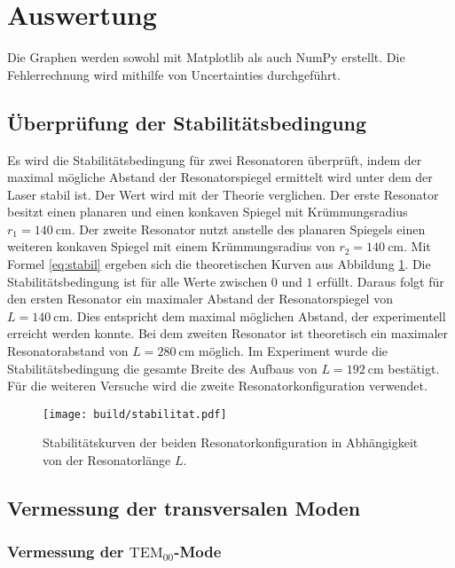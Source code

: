\section{Auswertung}
\label{sec:Auswertung}

Die Graphen werden sowohl mit Matplotlib \cite{matplotlib} als auch NumPy \cite{numpy} erstellt. Die Fehlerrechnung wird mithilfe von Uncertainties \cite{uncertainties} durchgeführt.

\subsection{Überprüfung der Stabilitätsbedingung}

Es wird die Stabilitätsbedingung für zwei Resonatoren überprüft, indem der maximal mögliche Abstand der Resonatorspiegel ermittelt wird unter dem der Laser stabil ist. Der Wert wird mit der Theorie verglichen. Der erste Resonator besitzt einen planaren und einen konkaven Spiegel mit Krümmungsradius $r_1=\SI{140}{\centi\metre}$.    
Der zweite Resonator nutzt anstelle des planaren Spiegels einen weiteren konkaven Spiegel mit einem Krümmungsradius von $r_2=\SI{140}{\centi\metre}$. 
Mit Formel \eqref{eq:stabil} ergeben sich die theoretischen Kurven aus Abbildung \ref{fig:stabilität}. 
Die Stabilitätsbedingung ist für alle Werte zwischen $0$ und $1$ erfüllt. Daraus folgt für den ersten Resonator ein maximaler Abstand der Resonatorspiegel von $L=\SI{140}{\centi\metre}$. Dies entspricht dem maximal möglichen Abstand, der experimentell erreicht werden konnte.
Bei dem zweiten Resonator ist theoretisch ein maximaler Resonatorabstand von $L=\SI{280}{\centi\metre}$ möglich. Im Experiment wurde die Stabilitätsbedingung die gesamte Breite des Aufbaus von $L=\SI{192}{\centi\metre}$ bestätigt. Für die weiteren Versuche wird die zweite Resonatorkonfiguration verwendet.

\begin{figure}
	\centering
	\texttt{[image: build/stabilitat.pdf]}
	\caption{Stabilitätskurven der beiden Resonatorkonfiguration in Abhängigkeit von der Resonatorlänge $L$.}
	\label{fig:stabilität}
\end{figure}

\subsection{Vermessung der transversalen Moden}
\subsubsection{Vermessung der $\mathrm{TEM}_{00}$-Mode}

